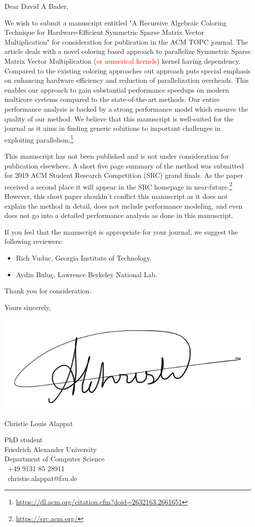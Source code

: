 \documentclass[english,10pt]{ethbrief3}
\date{June 01, 2019} %
\newcommand*{\marvosymbol}[1]{{\fontfamily{mvs}\fontencoding{U}\fontseries{m}\fontshape{n}\selectfont\char#1}}
\begin{document}

\opening{Dear David A Bader, }
We wish to submit a manuscript entitled "A Recursive Algebraic Coloring Technique for
Hardware-Efficient Symmetric Sparse Matrix Vector Multiplication" for consideration for
publication in the ACM TOPC journal. The article deals with a novel coloring based approach to 
parallelize Symmetric Sparse Matrix Vector Multiplication (\textcolor{red}{or numerical kernels}) 
kernel having dependency.  Compared to the existing coloring approaches out approach puts 
special emphasis on enhancing hardware efficiency and reduction of parallelization overheads.
This enables our approach to gain substantial performance speedups on modern multicore systems
compared to the state-of-the-art methods. Our entire performance analysis is backed by a strong 
performance model which ensures the quality of our method.
We believe that this manuscript is well-suited for the journal as it aims in finding
generic solutions to important challenges in exploiting parallelism.\footnote{\href{https://dl.acm.org/citation.cfm?doid=2632163.2661651}{https://dl.acm.org/citation.cfm?doid=2632163.2661651}}

This manuscript has not been published and is not under consideration for publication elsewhere.
A short five page summary of the method was submitted for 2019 ACM Student Research Competition (SRC) grand finals. 
As the paper received a second place it will appear in the SRC homepage in near-future.\footnote{\href{https://src.acm.org/}{https://src.acm.org/}}
 However, this short paper shouldn't conflict this manuscript as it does not explain
the method in detail, does not include performance modeling, and even does not go into a detailed performance analysis
as done in this manuscript.

If you feel that the manuscript is appropriate for your journal, we suggest the following
reviewers:
\begin{itemize}
	\item Rich Vuduc, Georgia Institute of Technology.
	\item Aydin Buluç, Lawrence Berkeley National Lab.
\end{itemize}

Thank you for consideration.

\closing{Yours sincerely,}

\vspace{-2.7cm}

\includegraphics[width=0.28\linewidth]{signature_alappat_christie.png}

Christie Louis Alappat

PhD student\\
Friedrich Alexander University\\
Department of Computer Science\\ 
\marvosymbol{72}~+49 9131 85 28911\\
\marvosymbol{66}~christie.alappat@fau.de\\
\end{document}
